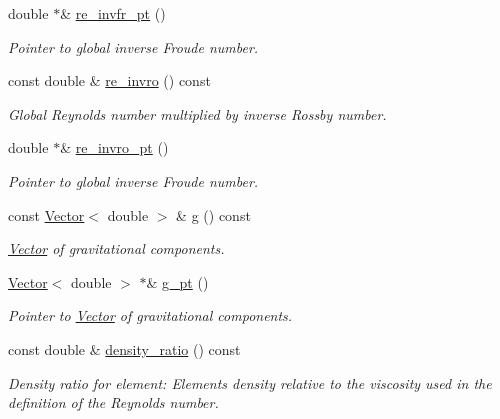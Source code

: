 \begin{DoxyCompactItemize}
double $\ast$\& \hyperlink{classoomph_1_1AxisymmetricNavierStokesEquations_a2b2641a17d3406043cdf535fb6ede367}{re\+\_\+invfr\+\_\+pt} ()
\begin{DoxyCompactList}\small\item\em Pointer to global inverse Froude number. \end{DoxyCompactList}\item 
const double \& \hyperlink{classoomph_1_1AxisymmetricNavierStokesEquations_a30e9502122f5c88cdfb33edb45d88c5f}{re\+\_\+invro} () const
\begin{DoxyCompactList}\small\item\em Global Reynolds number multiplied by inverse Rossby number. \end{DoxyCompactList}\item 
double $\ast$\& \hyperlink{classoomph_1_1AxisymmetricNavierStokesEquations_a5f10cf57b03c4a76b70151df35a249e3}{re\+\_\+invro\+\_\+pt} ()
\begin{DoxyCompactList}\small\item\em Pointer to global inverse Froude number. \end{DoxyCompactList}\item 
const \hyperlink{classoomph_1_1Vector}{Vector}$<$ double $>$ \& \hyperlink{classoomph_1_1AxisymmetricNavierStokesEquations_a518c31629e6ef42334cd031e2901efea}{g} () const
\begin{DoxyCompactList}\small\item\em \hyperlink{classoomph_1_1Vector}{Vector} of gravitational components. \end{DoxyCompactList}\item 
\hyperlink{classoomph_1_1Vector}{Vector}$<$ double $>$ $\ast$\& \hyperlink{classoomph_1_1AxisymmetricNavierStokesEquations_ac3d87734f99afe1ea996aa66e8211693}{g\+\_\+pt} ()
\begin{DoxyCompactList}\small\item\em Pointer to \hyperlink{classoomph_1_1Vector}{Vector} of gravitational components. \end{DoxyCompactList}\item 
const double \& \hyperlink{classoomph_1_1AxisymmetricNavierStokesEquations_a26df65fe19563b703fe274179e829900}{density\+\_\+ratio} () const
\begin{DoxyCompactList}\small\item\em Density ratio for element\+: Element\textquotesingle{}s density relative to the viscosity used in the definition of the Reynolds number. \end{DoxyCompactList}\item 

\end{DoxyCompactItemize}
